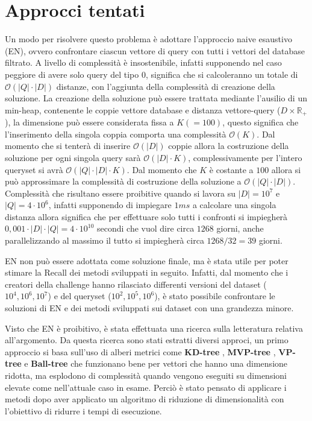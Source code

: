 \section{Approcci tentati}
Un modo per risolvere questo problema è adottare l'approccio naive esaustivo (EN), ovvero 
confrontare ciascun vettore di query con tutti i vettori del database filtrato. 
A livello di complessità è insostenibile, infatti supponendo nel caso peggiore 
di avere solo query del tipo $0$, significa che si calcoleranno un totale di 
$\mathcal{O}(|Q| \cdot |D|)$ distanze, con l'aggiunta della complessità di creazione
della soluzione. La creazione della soluzione può essere trattata mediante l'ausilio 
di un min-heap, contenente le coppie vettore database e distanza vettore-query ($D\times \mathbb{R}_+$),
la dimensione può essere considerata fissa a $K(=100)$, questo significa che l'inserimento 
della singola coppia comporta una complessità $\mathcal{O}(K)$. Dal momento che 
si tenterà di inserire $\mathcal{O}(|D|)$ coppie allora la costruzione della 
soluzione per ogni singola query sarà $\mathcal{O}(|D|\cdot K)$, complessivamente per l'intero 
queryset si avrà $\mathcal{O}(|Q| \cdot |D|\cdot K)$. Dal momento che $K$ è costante 
a $100$ allora si può approssimare la complessità di costruzione della soluzione 
a  $\mathcal{O}(|Q| \cdot |D|)$. Complessità che risultano essere proibitive quando 
si lavora su $|D|= 10^7$ e $|Q|= 4\cdot 10^6$, infatti supponendo di impiegare $1ms$ 
a calcolare una singola distanza allora significa che per effettuare solo tutti i 
confronti si impiegherà $0,001 \cdot |D| \cdot |Q| = 4\cdot 10^{10}$
secondi che vuol dire circa $1268$ giorni, anche parallelizzando al massimo 
il tutto si impiegherà circa $1268/32 = 39$ giorni. 

EN non può essere adottata come soluzione finale, ma è stata utile per poter 
stimare la Recall dei metodi sviluppati in seguito. Infatti, dal momento che i 
creatori della challenge hanno rilasciato differenti versioni del dataset ($10^4, 10^6, 10^7$) e del 
queryset ($10^2, 10^5, 10^6$), è stato possibile confrontare le soluzioni di EN
e dei metodi sviluppati sui dataset con una grandezza minore. 

Visto che EN è proibitivo, è stata effettuata una ricerca sulla letteratura 
relativa all'argomento. Da questa ricerca sono stati estratti diversi approci, 
un primo approccio si basa sull'uso di alberi metrici come \textbf{KD-tree} \cite{kd_tree}, \textbf{MVP-tree}
\cite{mvp_tree1} \cite{mvp_tree2}, \textbf{VP-tree} \cite{vp_tree} e \textbf{Ball-tree} \cite{ball_tree}
che funzionano bene per vettori che hanno una dimensione ridotta, ma esplodono 
di complessità quando vengono eseguiti su dimensioni elevate come nell'attuale 
caso in esame. Perciò è stato pensato di applicare i metodi dopo aver applicato 
un algoritmo di riduzione di dimensionalità con l'obiettivo di ridurre 
i tempi di esecuzione.

